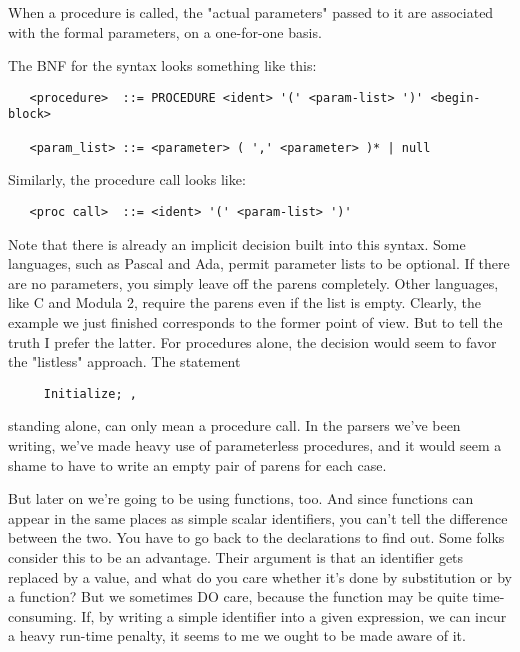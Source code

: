 When a procedure is called, the "actual parameters" passed to it are associated  with  the  formal  parameters, on  a one-for-one basis.

The BNF for the syntax looks something like this:

\begin{verbatim}
   <procedure>  ::= PROCEDURE <ident> '(' <param-list> ')' <begin-block>

   <param_list> ::= <parameter> ( ',' <parameter> )* | null
\end{verbatim}

Similarly, the procedure call looks like:

\begin{verbatim}
   <proc call>  ::= <ident> '(' <param-list> ')'
\end{verbatim}

Note that there is already an implicit decision  built  into this syntax. Some languages, such as Pascal and Ada, permit parameter lists to be  optional. If  there are no parameters, you simply leave off the parens  completely. Other  languages, like C and Modula 2, require the parens even if the list is empty. Clearly, the example we just finished corresponds to the  former  point of view. But to tell the truth I prefer the latter. For procedures alone, the  decision would seem to favor the "listless" approach. The statement

\begin{verbatim}
     Initialize; ,
\end{verbatim}

standing alone, can only  mean  a procedure call. In the parsers we've  been  writing, we've  made  heavy  use  of parameterless procedures, and it would seem a  shame  to have to write an empty pair of parens for each case.

But later on we're going to  be  using functions, too. And since functions  can  appear  in  the  same  places  as  simple  scalar identifiers, you can't tell the  difference between the two. You have to go  back  to  the  declarations  to find out. Some folks consider  this to be an advantage. Their  argument  is  that  an identifier gets replaced by a value, and what do you care whether it's done by  substitution  or  by  a function?  But we sometimes  DO  care, because the function may be quite time-consuming. If, by  writing  a  simple identifier into a given expression, we can incur a heavy run-time penalty, it seems to  me  we  ought  to be made aware of it.

